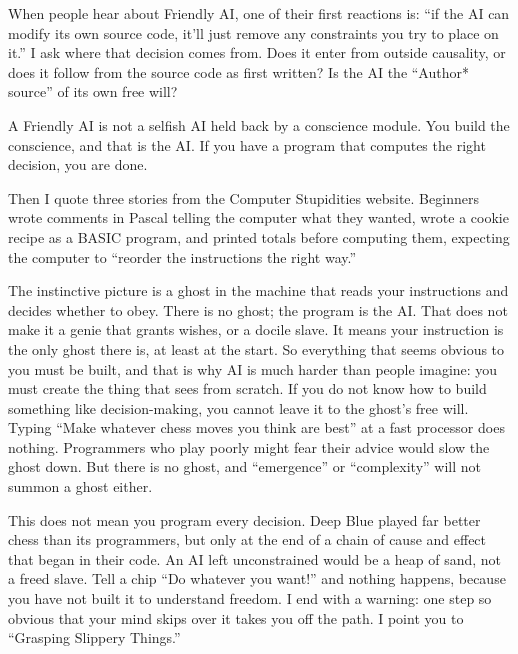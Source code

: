 
When people hear about Friendly AI, one of their first reactions is: ``if the AI can modify its own source code, it'll just remove any constraints you try to place on it.'' I ask where that decision comes from. Does it enter from outside causality, or does it follow from the source code as first written? Is the AI the ``Author* source'' of its own free will? 

A Friendly AI is not a selfish AI held back by a conscience module. You build the conscience, and that is the AI. If you have a program that computes the right decision, you are done. 

Then I quote three stories from the Computer Stupidities website. Beginners wrote comments in Pascal telling the computer what they wanted, wrote a cookie recipe as a BASIC program, and printed totals before computing them, expecting the computer to ``reorder the instructions the right way.'' 

The instinctive picture is a ghost in the machine that reads your instructions and decides whether to obey. There is no ghost; the program is the AI. That does not make it a genie that grants wishes, or a docile slave. It means your instruction is the only ghost there is, at least at the start. So everything that seems obvious to you must be built, and that is why AI is much harder than people imagine: you must create the thing that sees from scratch. If you do not know how to build something like decision-making, you cannot leave it to the ghost's free will.  Typing ``Make whatever chess moves you think are best'' at a fast processor does nothing. Programmers who play poorly might fear their advice would slow the ghost down. But there is no ghost, and ``emergence'' or ``complexity'' will not summon a ghost either.

This does not mean you program every decision. Deep Blue played far better chess than its programmers, but only at the end of a chain of cause and effect that began in their code. An AI left unconstrained would be a heap of sand, not a freed slave. Tell a chip ``Do whatever you want!'' and nothing happens, because you have not built it to understand freedom. I end with a warning: one step so obvious that your mind skips over it takes you off the path. I point you to ``Grasping Slippery Things.'' 

